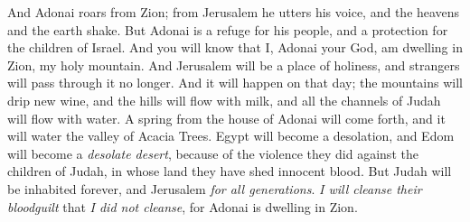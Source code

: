 \begin{biblechapter}
\verse And Adonai roars from Zion; 
from Jerusalem he utters his voice, 
and the heavens and the earth shake. 
But Adonai is a refuge for his people, 
and a protection for the children of Israel.
\verse And you will know that I, Adonai your God, 
am dwelling in Zion, my holy mountain. 
And Jerusalem will be a place of holiness, 
and strangers will pass through it no longer.
\verse And it will happen on that day; 
the mountains will drip new wine, 
and the hills will flow with milk, 
and all the channels of Judah will flow with water. 
A spring from the house of Adonai will come forth, 
and it will water the valley of Acacia Trees.
\verse Egypt will become a desolation, 
and Edom will become a \textit{desolate desert}, 
because of the violence they did against the children of Judah, 
in whose land they have shed innocent blood.
\verse But Judah will be inhabited forever, 
and Jerusalem \textit{for all generations}.
\verse \textit{I will cleanse their bloodguilt} that \textit{I did not cleanse}, 
for Adonai is dwelling in Zion.
\end{biblechapter}

